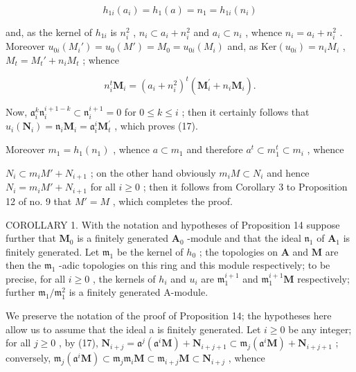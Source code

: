 \[
h _ {1 i} (a _ {i}) = h _ {1} (a) = n _ {1} = h _ {1 i} (n _ {i})
\]

and, as the kernel of \(h_{1i}\) is \(n_i^2\) , \(n_i \subset a_i + n_i^2\) and \(a_i \subset n_i\) , whence \(n_i = a_i + n_i^2\) . Moreover \(u_{0i}(M_i') = u_0(M') = M_0 = u_{0i}(M_i)\) and, as \(\text{Ker}(u_{0i}) = n_iM_i\) , \(M_t = M_t' + n_iM_t\) ; whence

\[
n _ {i} ^ {t} \mathbf {M} _ {i} = (a _ {i} + n _ {i} ^ {2}) ^ {t} (\mathbf {M} _ {i} ^ {\prime} + n _ {i} \mathbf {M} _ {i}).
\]

Now, \(\mathfrak{a}_i^k\mathfrak{n}_i^{i + 1 - k}\subset \mathfrak{n}_i^{i + 1} = 0\) for \(0\leqslant k\leqslant i\) ; then it certainly follows that \(u_{i}(\mathbf{N}_{i}) = \mathfrak{n}_{i}\mathbf{M}_{i} = \mathfrak{a}_{i}^{i}\mathbf{M}_{t}^{\prime}\) , which proves (17).

Moreover \(m_1 = h_1(n_1)\) , whence \(a \subset m_1\) and therefore \(a^t \subset m_1^t \subset m_i\) , whence

\(N_{i} \subset m_{i}M' + N_{i+1}\) ; on the other hand obviously \(m_{i}M \subset N_{i}\) and hence \(N_{i} = m_{i}M' + N_{i+1}\) for all \(i \geqslant 0\) ; then it follows from Corollary 3 to Proposition 12 of no. 9 that \(M' = M\) , which completes the proof.

COROLLARY 1. With the notation and hypotheses of Proposition 14 suppose further that \(\mathbf{M}_0\) is a finitely generated \(\mathbf{A}_0\) -module and that the ideal \(\mathfrak{n}_1\) of \(\mathbf{A}_1\) is finitely generated. Let \(\mathfrak{m}_1\) be the kernel of \(h_0\) ; the topologies on \(\mathbf{A}\) and \(\mathbf{M}\) are then the \(\mathfrak{m}_1\) -adic topologies on this ring and this module respectively; to be precise, for all \(i \geqslant 0\) , the kernels of \(h_i\) and \(u_i\) are \(\mathfrak{m}_1^{i+1}\) and \(\mathfrak{m}_1^{i+1}\mathbf{M}\) respectively; further \(\mathfrak{m}_1/\mathfrak{m}_1^2\) is a finitely generated A-module.

We preserve the notation of the proof of Proposition 14; the hypotheses here allow us to assume that the ideal a is finitely generated. Let \(i \geqslant 0\) be any integer; for all \(j \geqslant 0\) , by (17), \(\mathbf{N}_{i+j} = \mathfrak{a}^j (\mathfrak{a}^i\mathbf{M}) + \mathbf{N}_{i+j+1} \subset \mathfrak{m}_j(\mathfrak{a}^i\mathbf{M}) + \mathbf{N}_{i+j+1}\) ; conversely, \(\mathfrak{m}_j(\mathfrak{a}^i\mathbf{M}) \subset \mathfrak{m}_j\mathfrak{m}_i\mathbf{M} \subset \mathfrak{m}_{i+j}\mathbf{M} \subset \mathbf{N}_{i+j}\) , whence

